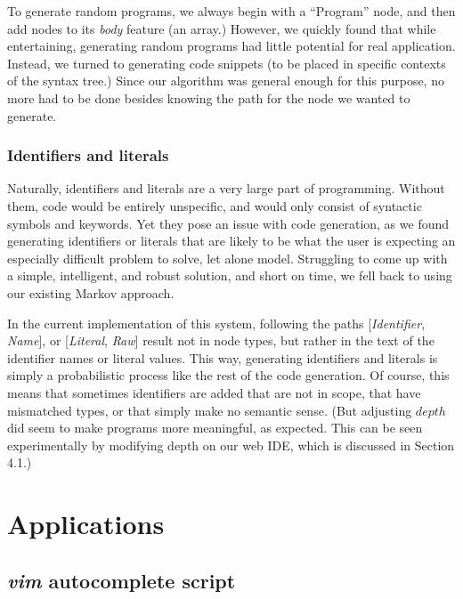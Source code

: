 \documentclass[titlepage]{article}
\begin{document}
To generate random programs, we always begin with a ``Program'' node, and then add nodes to its \emph{body} feature (an array.) However, we quickly found that while entertaining, generating random programs had little potential for real application. Instead, we turned to generating code snippets (to be placed in specific contexts of the syntax tree.) Since our algorithm was general enough for this purpose, no more had to be done besides knowing the path for the node we wanted to generate.

\subsubsection{Identifiers and literals}

Naturally, identifiers and literals are a very large part of programming. Without them, code would be entirely unspecific, and would only consist of syntactic symbols and keywords. Yet they pose an issue with code generation, as we found generating identifiers or literals that are likely to be what the user is expecting an especially difficult problem to solve, let alone model. Struggling to come up with a simple, intelligent, and robust solution, and short on time, we fell back to using our existing Markov approach.

In the current implementation of this system, following the paths [\emph{Identifier}, \emph{Name}], or [\emph{Literal}, \emph{Raw}] result not in node types, but rather in the text of the identifier names or literal values. This way, generating identifiers and literals is simply a probabilistic process like the rest of the code generation. Of course, this means that sometimes identifiers are added that are not in scope, that have mismatched types, or that simply make no semantic sense. (But adjusting $depth$ did seem to make programs more meaningful, as expected. This can be seen experimentally by modifying depth on our web IDE, which is discussed in Section 4.1.)

%

\section{Applications}

\subsection{\emph{vim} autocomplete script}
\end{document}
